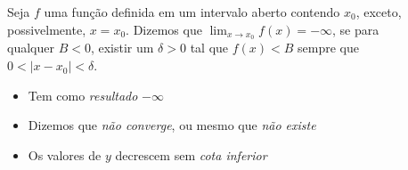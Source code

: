 \begin{frame}
  \begin{columns}[onlytextwidth]
    \begin{column}{0.6\textwidth}\vspace{-0.5cm}
      \begin{definition}
        Seja $f$ uma função definida em um intervalo aberto contendo $x_{0}$, exceto, possivelmente, $x=x_{0}$. Dizemos que $\displaystyle\lim_{x\to x_{0}}f(x)=-\infty$, se para qualquer $B<0$, existir um $\delta>0$ tal que $f(x)<B$ sempre que $0 < |x-x_{0}| < \delta$.
      \end{definition}
      \begin{itemize}
        \item Tem como \emph{resultado} $-\infty$
        \item Dizemos que \emph{não converge}, ou mesmo que \emph{não existe}
        \item Os valores de $y$ decrescem sem \emph{cota inferior}
      \end{itemize}
    \end{column}
    \begin{column}{0.4\textwidth}\vspace{-0.5cm}
      \begin{figure}
      \end{figure}
    \end{column}
  \end{columns}
\end{frame}


